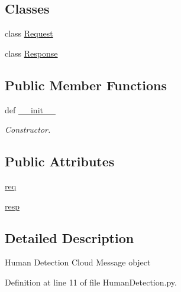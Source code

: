 \subsection*{Classes}
\begin{DoxyCompactItemize}
\item 
class \hyperlink{classRappCloud_1_1CloudMsgs_1_1HumanDetection_1_1HumanDetection_1_1Request}{Request}
\item 
class \hyperlink{classRappCloud_1_1CloudMsgs_1_1HumanDetection_1_1HumanDetection_1_1Response}{Response}
\end{DoxyCompactItemize}
\subsection*{Public Member Functions}
\begin{DoxyCompactItemize}
\item 
def \hyperlink{classRappCloud_1_1CloudMsgs_1_1HumanDetection_1_1HumanDetection_a3d00a16455aca1f6958a690cb9b5f672}{\-\_\-\-\_\-init\-\_\-\-\_\-}
\begin{DoxyCompactList}\small\item\em Constructor. \end{DoxyCompactList}\end{DoxyCompactItemize}
\subsection*{Public Attributes}
\begin{DoxyCompactItemize}
\item 
\hyperlink{classRappCloud_1_1CloudMsgs_1_1HumanDetection_1_1HumanDetection_ab9114733a5d1f42b74b5bbbff8fad362}{req}
\item 
\hyperlink{classRappCloud_1_1CloudMsgs_1_1HumanDetection_1_1HumanDetection_a1167292691f49487b22f2b752592755c}{resp}
\end{DoxyCompactItemize}


\subsection{Detailed Description}
\begin{DoxyVerb}Human Detection Cloud Message object\end{DoxyVerb}
 

Definition at line 11 of file Human\-Detection.\-py.



